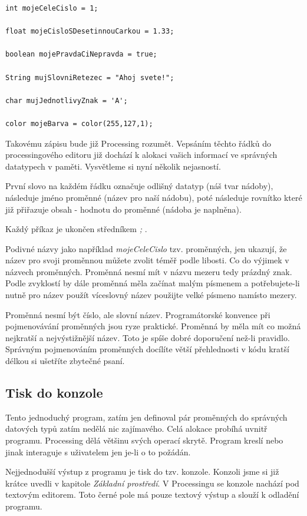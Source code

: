 \documentclass[11pt]{book}
\newcommand{\pododdil}[1]{\subsection{#1}\label{subsec:#1}}
\begin{document}
\begin{lstlisting}
int mojeCeleCislo = 1;

float mojeCisloSDesetinnouCarkou = 1.33;

boolean mojePravdaCiNepravda = true;

String mujSlovniRetezec = "Ahoj svete!";

char mujJednotlivyZnak = 'A';

color mojeBarva = color(255,127,1);
\end{lstlisting}

Takovému zápisu bude již Processing rozumět. Vepsáním těchto řádků do processingového editoru již dochází k alokaci vašich informací ve správných datatypech v paměti. Vysvětleme si nyní několik nejasností.

První slovo na každém řádku označuje odlišný datatyp (náš tvar nádoby), následuje jméno proměnné (název pro naší nádobu), poté následuje rovnítko které již přiřazuje obsah - hodnotu do proměnné (nádoba je naplněna).

Každý příkaz je ukončen středníkem {\em ;} .

Podivné názvy jako například {\em mojeCeleCislo} tzv. proměnných, jen ukazují, že název pro svoji proměnnou můžete zvolit téměř podle libosti. Co do výjimek v názvech proměnných. Proměnná nesmí mít v názvu mezeru tedy prázdný znak. Podle zvyklostí by dále proměnná měla začínat malým písmenem a potřebujete-li nutně pro název použít víceslovný název použijte velké písmeno namísto mezery.

Proměnná nesmí být číslo, ale slovní název. Programátorské konvence při pojmenovávání proměnných jsou ryze praktické. Proměnná by měla mít co možná nejkratší a nejvýstižnější název.  Toto je spíše dobré doporučení než-li pravidlo. Správným pojmenováním proměnných docílíte větší přehlednosti v kódu kratší délkou si ušetříte zbytečné psaní.

\pododdil{Tisk do konzole}

Tento jednoduchý program, zatím jen definoval pár proměnných do správných datových typů zatím nedělá nic zajímavého. Celá alokace probíhá uvnitř programu. Processing dělá většinu svých operací skrytě. Program kreslí nebo jinak interaguje s uživatelem jen je-li o to požádán.

Nejjednodušší výstup z programu je tisk do tzv. konzole. Konzoli jsme si již krátce uvedli v kapitole {\em Základní prostředí}. V Processingu se konzole nachází pod textovým editorem. Toto černé pole má pouze textový výstup a slouží k odladění programu.
\end{document}
